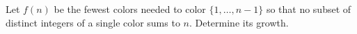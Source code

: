 Let $f(n)$ be the fewest colors needed to color $\{1,\ldots,n-1\}$ so that no subset of distinct integers of a single color sums to $n$. Determine its growth.

